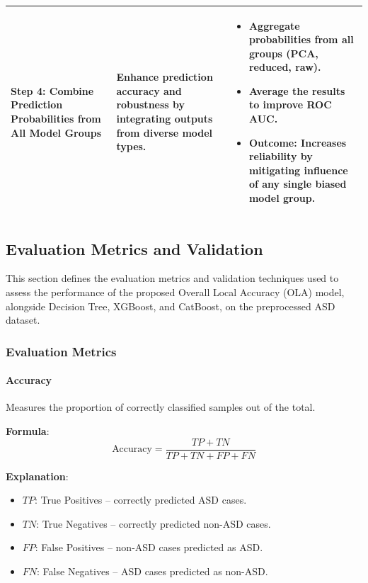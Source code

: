 \documentclass[conference]{IEEEtran}
\begin{document}
\begin{enumerate}
\begin{table}[H]
{\begin{tabular}{|p{3.8cm}|p{5.5cm}|p{5.8cm}|}
\rule{0pt}{15pt} \textbf{Step 4: Combine Prediction Probabilities from All Model Groups} & Enhance prediction accuracy and robustness by integrating outputs from diverse model types. & 
\begin{itemize}
    \item Aggregate probabilities from all groups (PCA, reduced, raw).
    \item Average the results to improve ROC AUC.
    \item \textbf{Outcome:} Increases reliability by mitigating influence of any single biased model group.
\end{itemize} \\
\hline
\end{tabular}}
\end{table}

\end{enumerate}

\subsection{Evaluation Metrics and Validation}

This section defines the evaluation metrics and validation techniques used to assess the performance of the proposed Overall Local Accuracy (OLA) model, alongside Decision Tree, XGBoost, and CatBoost, on the preprocessed ASD dataset.

\subsubsection{Evaluation Metrics}

\paragraph{Accuracy}

Measures the proportion of correctly classified samples out of the total.  

\textbf{Formula}:
\[
\text{Accuracy} = \frac{TP + TN}{TP + TN + FP + FN}
\]

\textbf{Explanation}:
\begin{itemize}
    \item $TP$: True Positives – correctly predicted ASD cases.
    \item $TN$: True Negatives – correctly predicted non-ASD cases.
    \item $FP$: False Positives – non-ASD cases predicted as ASD.
    \item $FN$: False Negatives – ASD cases predicted as non-ASD.
\end{itemize}
\end{document}
